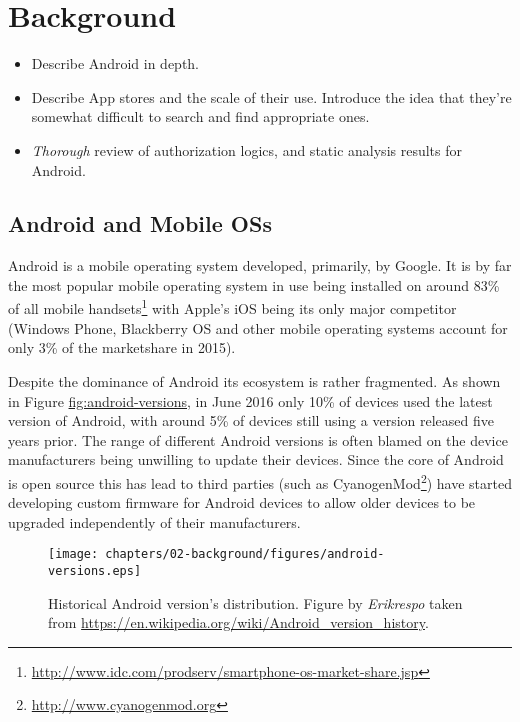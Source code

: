 \documentclass[thesis.tex]{subfiles}
\begin{document}
\chapter{Background}

\begin{todo}
  \begin{itemize}
  \item Describe Android in depth.
  \item Describe App stores and the scale of their use.  Introduce
    the idea that they're somewhat difficult to search and find appropriate
    ones.
  \item \emph{Thorough} review of authorization logics, and static analysis
    results for Android.
  \end{itemize}
\end{todo}

\section{Android and Mobile OSs}\label{android}

Android is a mobile operating system developed, primarily, by Google. It
is by far the most popular mobile operating system in use being
installed on around 83\% of all mobile handsets\footnote{\url{http://www.idc.com/prodserv/smartphone-os-market-share.jsp}}
with Apple's iOS being its only major competitor (Windows Phone,
Blackberry OS and other mobile operating systems account for only 3\% of
the marketshare in 2015).

Despite the dominance of Android its ecosystem is rather fragmented. As
shown in Figure \url{fig:android-versions}, in June 2016 only 10\% of
devices used the latest version of Android, with around 5\% of devices
still using a version released five years prior. The range of different
Android versions is often blamed on the device manufacturers being
unwilling to update their devices. Since the core of Android is open
source this has lead to third parties (such as CyanogenMod\footnote{\url{http://www.cyanogenmod.org}})
have started developing custom firmware for Android devices to allow
older devices to be upgraded independently of their manufacturers.

\begin{figure*}[htbp]
\centering
\texttt{[image: chapters/02-background/figures/android-versions.eps]}
\caption[ Historical Android version's distribution. ]{Historical Android version's distribution. Figure by \emph{Erikrespo} taken from \url{https://en.wikipedia.org/wiki/Android_version_history}.}
\end{figure*}
\end{document}
